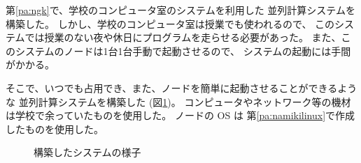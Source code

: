 \def \wrkdir {p.cctn/}


 \label{pa:cctn}

第\ref{pa:ngk}\postmpartname{}で、学校のコンピュータ室のシステムを利用した
並列計算システムを構築した。
しかし、学校のコンピュータ室は授業でも使われるので、
このシステムでは授業のない夜や休日にプログラムを走らせる必要があった。
また、このシステムのノードは1台1台手動で起動させるので、
システムの起動には手間がかかる。

そこで、いつでも占用でき、また、ノードを簡単に起動させることができるような
並列計算システムを構築した (図\ref{fig:cctn:front})。
コンピュータやネットワーク等の機材は学校で余っていたものを使用した。
ノードの OS は
第\ref{pa:namikilinux}\postmpartname{}で作成したものを使用した。

\begin{figure}[htb]
\centering
\begin{minipage}{0.5\linewidth}
\caption{構築したシステムの様子}
\label{fig:cctn:front}
\end{minipage}
\end{figure}
